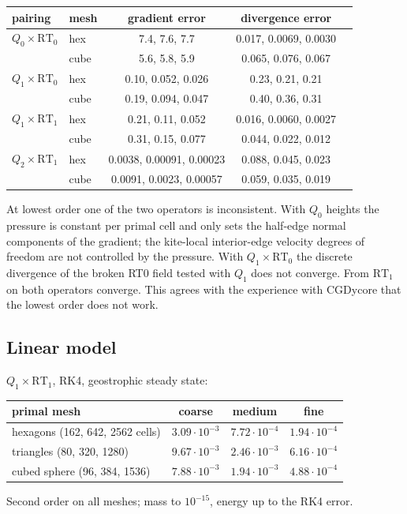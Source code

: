 \documentclass[11pt,a4paper]{article}
\begin{document}
\begin{center}
\begin{tabular}{llccc}
\toprule
pairing & mesh & gradient error & divergence error \\
\midrule
$Q_0\times\mathrm{RT}_0$ & hex  & 7.4, 7.6, 7.7 & 0.017, 0.0069, 0.0030 \\
                         & cube & 5.6, 5.8, 5.9 & 0.065, 0.076, 0.067 \\
$Q_1\times\mathrm{RT}_0$ & hex  & 0.10, 0.052, 0.026 & 0.23, 0.21, 0.21 \\
                         & cube & 0.19, 0.094, 0.047 & 0.40, 0.36, 0.31 \\
$Q_1\times\mathrm{RT}_1$ & hex  & 0.21, 0.11, 0.052 & 0.016, 0.0060, 0.0027 \\
                         & cube & 0.31, 0.15, 0.077 & 0.044, 0.022, 0.012 \\
$Q_2\times\mathrm{RT}_1$ & hex  & 0.0038, 0.00091, 0.00023 & 0.088, 0.045, 0.023 \\
                         & cube & 0.0091, 0.0023, 0.00057 & 0.059, 0.035, 0.019 \\
\bottomrule
\end{tabular}
\end{center}
At lowest order one of the two operators is inconsistent. With $Q_0$ heights the
pressure is constant per primal cell and only sets the half-edge normal
components of the gradient; the kite-local interior-edge velocity degrees of
freedom are not controlled by the pressure. With $Q_1\times\mathrm{RT}_0$ the
discrete divergence of the broken RT0 field tested with $Q_1$ does not converge.
From $\mathrm{RT}_1$ on both operators converge. This agrees with the
experience with CGDycore that the lowest order does not work.

\subsection{Linear model}
$Q_1\times\mathrm{RT}_1$, RK4, geostrophic steady state:

\begin{center}
\begin{tabular}{lccc}
\toprule
primal mesh & coarse & medium & fine \\
\midrule
hexagons (162, 642, 2562 cells) & $3.09\cdot10^{-3}$ & $7.72\cdot10^{-4}$ & $1.94\cdot10^{-4}$ \\
triangles (80, 320, 1280)       & $9.67\cdot10^{-3}$ & $2.46\cdot10^{-3}$ & $6.16\cdot10^{-4}$ \\
cubed sphere (96, 384, 1536)    & $7.88\cdot10^{-3}$ & $1.94\cdot10^{-3}$ & $4.88\cdot10^{-4}$ \\
\bottomrule
\end{tabular}
\end{center}
Second order on all meshes; mass to $10^{-15}$, energy up to the RK4 error.
\end{document}
